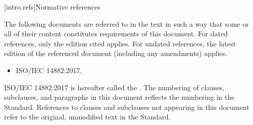 
[intro.refs]{Normative references}

\pnum

The following documents are referred to in the text in such a way
that some or all of their content constitutes requirements of this 
document. For dated references, only the edition cited applies.
 For undated references, the latest edition
 of the referenced document (including any amendments) applies.

 \begin{itemize}
 \item ISO/IEC 14882:2017, 
 \end{itemize}

ISO/IEC 14882:2017 is hereafter called the .
 The numbering of clauses, subclauses, and paragraphs in this document
 reflects the numbering in the \Cpp Standard. References to clauses
 and subclauses not appearing in this document refer to
 the original, unmodified text in the \Cpp Standard.

